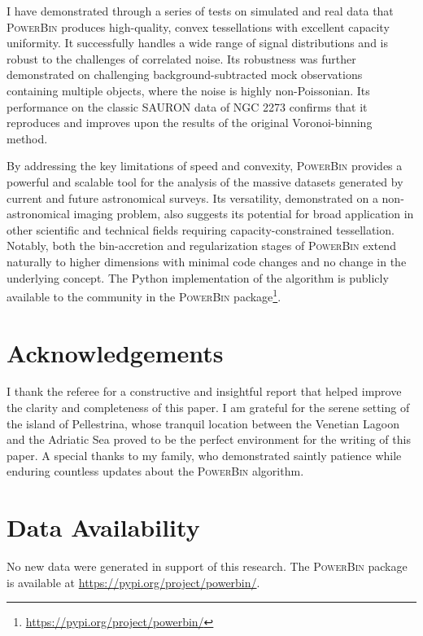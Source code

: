 \documentclass[fleqn,usenatbib]{mnras}
\begin{document}
I have demonstrated through a series of tests on simulated and real data that \textsc{PowerBin} produces high-quality, convex tessellations with excellent capacity uniformity. It successfully handles a wide range of signal distributions and is robust to the challenges of correlated noise. Its robustness was further demonstrated on challenging background-subtracted mock observations containing multiple objects, where the noise is highly non-Poissonian. Its performance on the classic SAURON data of NGC 2273 confirms that it reproduces and improves upon the results of the original Voronoi-binning method.

By addressing the key limitations of speed and convexity, \textsc{PowerBin} provides a powerful and scalable tool for the analysis of the massive datasets generated by current and future astronomical surveys. Its versatility, demonstrated on a non-astronomical imaging problem, also suggests its potential for broad application in other scientific and technical fields requiring capacity-constrained tessellation. Notably, both the bin-accretion and regularization stages of \textsc{PowerBin} extend naturally to higher dimensions with minimal code changes and no change in the underlying concept. The Python implementation of the algorithm is publicly available to the community in the \textsc{PowerBin} package\footnote{\url{https://pypi.org/project/powerbin/}}.


\section*{Acknowledgements}

I thank the referee for a constructive and insightful report that helped improve the clarity and completeness of this paper.
I am grateful for the serene setting of the island of Pellestrina, whose tranquil location between the Venetian Lagoon and the Adriatic Sea proved to be the perfect environment for the writing of this paper. A special thanks to my family, who demonstrated saintly patience while enduring countless updates about the \textsc{PowerBin} algorithm.

\section*{Data Availability}

No new data were generated in support of this research. The \textsc{PowerBin} package is available at \url{https://pypi.org/project/powerbin/}.
\end{document}
